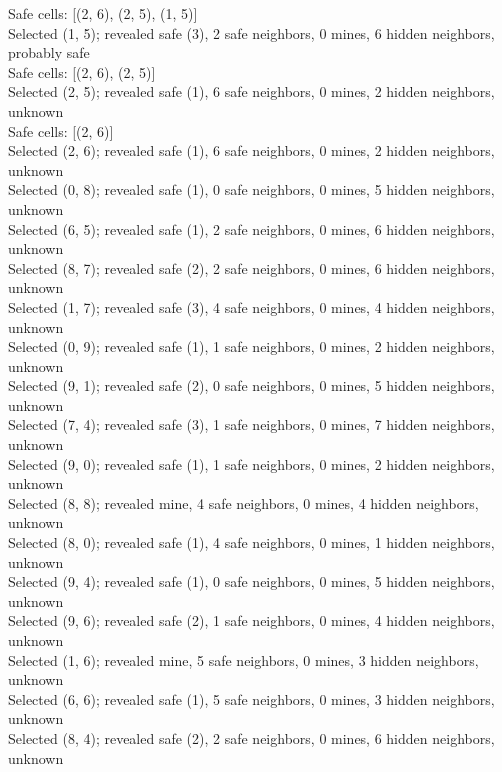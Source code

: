 \documentclass[11pt]{article} %
\begin{document}
Safe cells: [(2, 6), (2, 5), (1, 5)]\\
Selected (1, 5); revealed safe (3), 2 safe neighbors, 0 mines, 6 hidden neighbors, probably safe\\
Safe cells: [(2, 6), (2, 5)]\\
Selected (2, 5); revealed safe (1), 6 safe neighbors, 0 mines, 2 hidden neighbors, unknown\\
Safe cells: [(2, 6)]\\
Selected (2, 6); revealed safe (1), 6 safe neighbors, 0 mines, 2 hidden neighbors, unknown\\
Selected (0, 8); revealed safe (1), 0 safe neighbors, 0 mines, 5 hidden neighbors, unknown\\
Selected (6, 5); revealed safe (1), 2 safe neighbors, 0 mines, 6 hidden neighbors, unknown\\
Selected (8, 7); revealed safe (2), 2 safe neighbors, 0 mines, 6 hidden neighbors, unknown\\
Selected (1, 7); revealed safe (3), 4 safe neighbors, 0 mines, 4 hidden neighbors, unknown\\
Selected (0, 9); revealed safe (1), 1 safe neighbors, 0 mines, 2 hidden neighbors, unknown\\
Selected (9, 1); revealed safe (2), 0 safe neighbors, 0 mines, 5 hidden neighbors, unknown\\
Selected (7, 4); revealed safe (3), 1 safe neighbors, 0 mines, 7 hidden neighbors, unknown\\
Selected (9, 0); revealed safe (1), 1 safe neighbors, 0 mines, 2 hidden neighbors, unknown\\
Selected (8, 8); revealed mine, 4 safe neighbors, 0 mines, 4 hidden neighbors, unknown\\
Selected (8, 0); revealed safe (1), 4 safe neighbors, 0 mines, 1 hidden neighbors, unknown\\
Selected (9, 4); revealed safe (1), 0 safe neighbors, 0 mines, 5 hidden neighbors, unknown\\
Selected (9, 6); revealed safe (2), 1 safe neighbors, 0 mines, 4 hidden neighbors, unknown\\
Selected (1, 6); revealed mine, 5 safe neighbors, 0 mines, 3 hidden neighbors, unknown\\
Selected (6, 6); revealed safe (1), 5 safe neighbors, 0 mines, 3 hidden neighbors, unknown\\
Selected (8, 4); revealed safe (2), 2 safe neighbors, 0 mines, 6 hidden neighbors, unknown\\
\end{document}

